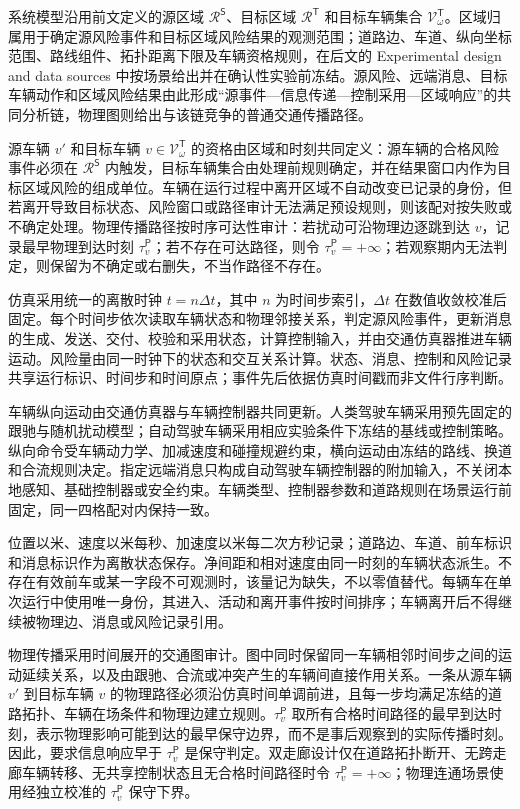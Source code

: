 \documentclass[10pt,a4paper,twocolumn]{article}
\begin{document}
系统模型沿用前文定义的源区域 $\mathcal R^{\mathsf S}$、目标区域 $\mathcal R^{\mathsf T}$ 和目标车辆集合 $\mathcal V^{\mathsf T}_{\omega}$。区域归属用于确定源风险事件和目标区域风险结果的观测范围；道路边、车道、纵向坐标范围、路线组件、拓扑距离下限及车辆资格规则，在后文的 Experimental design and data sources 中按场景给出并在确认性实验前冻结。源风险、远端消息、目标车辆动作和区域风险结果由此形成“源事件—信息传递—控制采用—区域响应”的共同分析链，物理图则给出与该链竞争的普通交通传播路径。

源车辆 $v'$ 和目标车辆 $v\in\mathcal V^{\mathsf T}_{\omega}$ 的资格由区域和时刻共同定义：源车辆的合格风险事件必须在 $\mathcal R^{\mathsf S}$ 内触发，目标车辆集合由处理前规则确定，并在结果窗口内作为目标区域风险的组成单位。车辆在运行过程中离开区域不自动改变已记录的身份，但若离开导致目标状态、风险窗口或路径审计无法满足预设规则，则该配对按失败或不确定处理。物理传播路径按时序可达性审计：若扰动可沿物理边逐跳到达 $v$，记录最早物理到达时刻 $\tau_v^{\mathsf P}$；若不存在可达路径，则令 $\tau_v^{\mathsf P}=+\infty$；若观察期内无法判定，则保留为不确定或右删失，不当作路径不存在。

仿真采用统一的离散时钟 $t=n\Delta t$，其中 $n$ 为时间步索引，$\Delta t$ 在数值收敛校准后固定。每个时间步依次读取车辆状态和物理邻接关系，判定源风险事件，更新消息的生成、发送、交付、校验和采用状态，计算控制输入，并由交通仿真器推进车辆运动。风险量由同一时钟下的状态和交互关系计算。状态、消息、控制和风险记录共享运行标识、时间步和时间原点；事件先后依据仿真时间戳而非文件行序判断。

车辆纵向运动由交通仿真器与车辆控制器共同更新。人类驾驶车辆采用预先固定的跟驰与随机扰动模型；自动驾驶车辆采用相应实验条件下冻结的基线或控制策略。纵向命令受车辆动力学、加减速度和碰撞规避约束，横向运动由冻结的路线、换道和合流规则决定。指定远端消息只构成自动驾驶车辆控制器的附加输入，不关闭本地感知、基础控制器或安全约束。车辆类型、控制器参数和道路规则在场景运行前固定，同一四格配对内保持一致。

位置以米、速度以米每秒、加速度以米每二次方秒记录；道路边、车道、前车标识和消息标识作为离散状态保存。净间距和相对速度由同一时刻的车辆状态派生。不存在有效前车或某一字段不可观测时，该量记为缺失，不以零值替代。每辆车在单次运行中使用唯一身份，其进入、活动和离开事件按时间排序；车辆离开后不得继续被物理边、消息或风险记录引用。

物理传播采用时间展开的交通图审计。图中同时保留同一车辆相邻时间步之间的运动延续关系，以及由跟驰、合流或冲突产生的车辆间直接作用关系。一条从源车辆 $v'$ 到目标车辆 $v$ 的物理路径必须沿仿真时间单调前进，且每一步均满足冻结的道路拓扑、车辆在场条件和物理边建立规则。$\tau_v^{\mathsf P}$ 取所有合格时间路径的最早到达时刻，表示物理影响可能到达的最早保守边界，而不是事后观察到的实际传播时刻。因此，要求信息响应早于 $\tau_v^{\mathsf P}$ 是保守判定。双走廊设计仅在道路拓扑断开、无跨走廊车辆转移、无共享控制状态且无合格时间路径时令 $\tau_v^{\mathsf P}=+\infty$；物理连通场景使用经独立校准的 $\tau_v^{\mathsf P}$ 保守下界。
\end{document}
